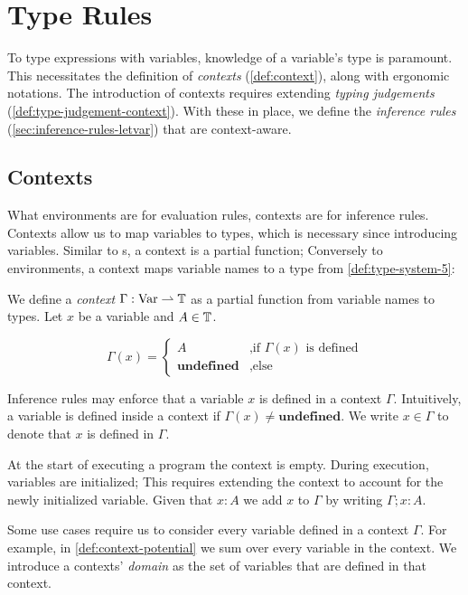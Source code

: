 \section{Type Rules}\label{sec:type-rules-5}

To type expressions with variables, knowledge of a variable's type is paramount. This necessitates the definition of \emph{contexts} (\cref{def:context}), along with ergonomic notations. The introduction of contexts requires extending \emph{typing judgements} (\cref{def:type-judgement-context}). With these in place, we define the \emph{inference rules} (\cref{sec:inference-rules-letvar}) that are context-aware.

\subsection{Contexts}

What environments are for evaluation rules, contexts are for inference rules. Contexts allow us to map variables to types, which is necessary since introducing variables. Similar to s, a context is a partial function; Conversely to environments, a context maps variable names to a type from \cref{def:type-system-5}:

\begin{definition}[Context]\label{def:context}
   We define a \emph{context} \(\Gamma : \text{Var} \rightharpoonup \text{\ensuremath{\mathbb{T}}}\) as a partial function from variable names to types. Let \(x\) be a variable and \(A \in \mathbb{T}\).

   \[
      \Gamma(x) = 
      \begin{cases}
	 A		      & \mbox{,if } \Gamma(x) \text{ is defined}\\
	 \textbf{undefined}   & \mbox{,else } 
      \end{cases}
   \]
\end{definition}

Inference rules may enforce that a variable \(x\) is defined in a context \(\Gamma\). Intuitively, a variable is defined inside a context if \(\Gamma(x) \neq \textbf{undefined}\). We write \(x \in \Gamma\) to denote that \(x\) is defined in \(\Gamma\).

At the start of executing a program the context is empty. During execution, variables are initialized; This requires extending the context to account for the newly initialized variable. Given that \(x : A\) we add \(x\) to \(\Gamma\) by writing \(\Gamma; x : A\).

Some use cases require us to consider every variable defined in a context \(\Gamma\). For example, in \cref{def:context-potential} we sum over every variable in the context. We introduce a contexts' \emph{domain} as the set of variables that are defined in that context.

